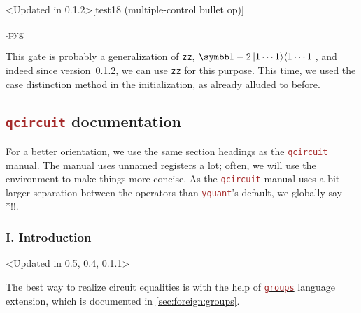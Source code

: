 \documentclass{scrartcl}
\makeatletter
\newenvironment{codeexample}{%
   \VerbatimEnvironment%
   \let\FVB@VerbatimOut\minted@FVB@VerbatimOut
   \let\FVE@VerbatimOut\minted@FVE@VerbatimOut
   \minted@configlang{tex}%
   \minted@fvset
   \begin{VerbatimOut}[codes={\catcode`\^^I=12},firstline,lastline]{\minted@jobname.pyg}%
}{
   \end{VerbatimOut}%
   \minted@langlinenoson%
   \savebox\codeexamplebox{ \minted@jobname.pyg}%
   \ifdim\wd\codeexamplebox>\dimexpr.5\linewidth-3mm\relax%
      \wd\codeexamplebox=.5\linewidth%
   \else%
      \wd\codeexamplebox=\dimexpr\wd\codeexamplebox+3mm\relax%
   \fi%
   \noindent\begin{minipage}{\wd\codeexamplebox}%
      \centering%
      \usebox\codeexamplebox%
   \end{minipage}%
   \begin{minipage}{\dimexpr\linewidth-\wd\codeexamplebox\relax}%
      \expandafter\minted@pygmentize\expandafter{\minted@lang}%
   \end{minipage}%
   \minted@langlinenosoff%
   \par%
}
\newenvironment{codeexample*}{%
   \VerbatimEnvironment%
   \let\FVB@VerbatimOut\minted@FVB@VerbatimOut
   \let\FVE@VerbatimOut\minted@FVE@VerbatimOut
   \minted@configlang{tex}%
   \minted@fvset
   \begin{VerbatimOut}[codes={\catcode`\^^I=12},firstline,lastline]{\minted@jobname.pyg}%
}{
   \end{VerbatimOut}%
   \minted@langlinenoson%
   \begin{adjustbox}{center}
       \minted@jobname.pyg %
   \end{adjustbox}\nopagebreak
   \expandafter\minted@pygmentize\expandafter{\minted@lang}%
   \minted@langlinenosoff%
   \par%
}
\def\pkg#1{\textcolor{brown}{\texttt{#1}}}
\def\langlink#1{\hyperref[sec:foreign:#1]{\pkg{#1}}}
\def\ttlink{\link\texttt}
\def\texlink{\link\tex}
\def\Yquant{\pkg{yquant}}
\def\ketbra#1#2{\ket{#1}\!\bra{#2}}
\makeatother
\begin{document}
         \begin{example}<Updated in 0.1.2>[test18 (multiple-control bullet op)]
            \begin{codeexample}
            \end{codeexample}
            This gate is probably a generalization of \ttlink{zz}, $\symbb1 - 2 \ketbra{1\dotsm1}{1\dotsm1}$, and indeed since version~0.1.2, we can use \ttlink{zz} for this purpose.
            This time, we used the case distinction method in the initialization, as already alluded to before.
         \end{example}
      \endgroup

      \clearpage
      \subsection{\pkg{qcircuit} documentation}
      \begingroup%
         For a better orientation, we use the same section headings as the \pkg{qcircuit} manual.
         The manual uses unnamed registers a lot; often, we will use the \texlink{yquant*} environment to make things more concise.
         As the \pkg{qcircuit} manual uses a bit larger separation between the operators than \Yquant's default, we globally say\\*\tex!!.

         \subsubsection{I. Introduction}
            \begin{example}<Updated in 0.5, 0.4, 0.1.1>%
               \begin{codeexample*}
\begin{yquantgroup}
   \equals
\end{yquantgroup}
               \end{codeexample*}
               The best way to realize circuit equalities is with the help of \langlink{groups} language extension, which is documented in \cref{sec:foreign:groups}.
            \end{example}
\end{document}
